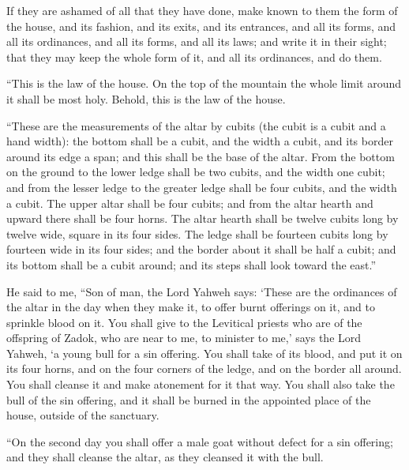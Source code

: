 {If they are ashamed of all that they have done, make known to them the form of the house, and its fashion, and its exits, and its entrances, and all its forms, and all its ordinances, and all its forms, and all its laws; and write it in their sight; that they may keep the whole form of it, and all its ordinances, and do them.
\par }{\PP {}“This is the law of the house. On the top of the mountain the whole limit around it shall be most holy. Behold, this is the law of the house.
\par }{\PP {}“These are the measurements of the altar by cubits (the cubit is a cubit and a hand width): the bottom shall be a cubit, and the width a cubit, and its border around its edge a span; and this shall be the base of the altar.
From the bottom on the ground to the lower ledge shall be two cubits, and the width one cubit; and from the lesser ledge to the greater ledge shall be four cubits, and the width a cubit.
The upper altar shall be four cubits; and from the altar hearth and upward there shall be four horns.
The altar hearth shall be twelve cubits long by twelve wide, square in its four sides.
The ledge shall be fourteen cubits long by fourteen wide in its four sides; and the border about it shall be half a cubit; and its bottom shall be a cubit around; and its steps shall look toward the east.”
\par }{\PP {}He said to me, “Son of man, the Lord Yahweh says: ‘These are the ordinances of the altar in the day when they make it, to offer burnt offerings on it, and to sprinkle blood on it.
You shall give to the Levitical priests who are of the offspring of Zadok, who are near to me, to minister to me,’ says the Lord Yahweh, ‘a young bull for a sin offering.
You shall take of its blood, and put it on its four horns, and on the four corners of the ledge, and on the border all around. You shall cleanse it and make atonement for it that way.
You shall also take the bull of the sin offering, and it shall be burned in the appointed place of the house, outside of the sanctuary.
\par }{\PP {}“On the second day you shall offer a male goat without defect for a sin offering; and they shall cleanse the altar, as they cleansed it with the bull.
}
